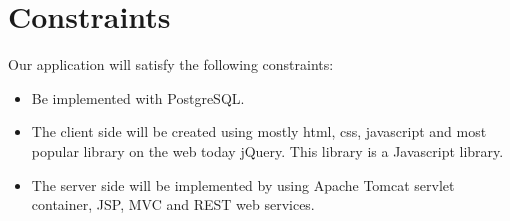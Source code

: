 \section{Constraints}
Our application will satisfy the following constraints:

\begin{itemize}
\item Be implemented with PostgreSQL.
\item The client side will be created using mostly html, css, javascript and most popular library on the web today jQuery. This library is a Javascript library.
\item The server side will be implemented by using Apache Tomcat servlet container, JSP, MVC and REST web services.
\end{itemize}
